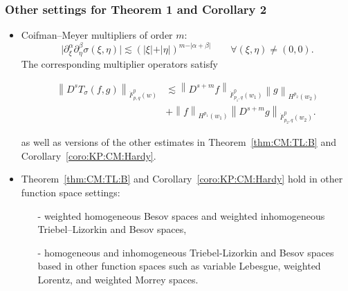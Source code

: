 \documentclass[xcolor=dvipsnames]{beamer}
\newcommand{\abs}[1]{\vert #1 \vert}
\newcommand{\norm}[2]{{\left\| #1 \right\|}_{#2}}
\newcommand{\tlw}[4]{\dot F_{#1,#3}^{#2}(#4)} %
\begin{document}
\begin{frame}\frametitle{Other settings for Theorem 1 and Corollary 2}

\begin{itemize}
\item Coifman--Meyer multipliers of order $m:$
\begin{equation*}
\abs{\partial_\xi^\alpha\partial_\eta^\beta\sigma(\xi,\eta)}\lesssim (\abs{\xi}+\abs{\eta})^{m-\abs{\alpha+\beta}} \quad \quad \forall (\xi,\eta)\neq(0,0).
\end{equation*}
The corresponding multiplier operators satisfy

\begin{align*}
\norm{D^s T_\sigma(f,g)}{\tlw{p}{0}{q}{w}} &\lesssim \norm{D^{s+m}f}{\tlw{p_1}{0}{q}{w_1} } \norm{g}{H^{p_2}(w_2)} \\
& +  \norm{f}{H^{p_1}(w_1)} \norm{D^{s+m}g}{\tlw{p_2}{0}{q}{w_2} }.
\end{align*}

as well as versions of the other estimates in Theorem~\ref{thm:CM:TL:B} and Corollary~\ref{coro:KP:CM:Hardy}.

\bigskip


\item Theorem~\ref{thm:CM:TL:B} and Corollary~\ref{coro:KP:CM:Hardy} hold in other function space settings: 

\begin{enumerate}[-]
\item[-] weighted homogeneous Besov spaces and weighted inhomogeneous Triebel--Lizorkin and Besov spaces,

\item[-] homogeneous and inhomogeneous Triebel-Lizorkin and Besov spaces based in other function spaces such as variable Lebesgue, weighted Lorentz, and weighted Morrey spaces. 
\end{enumerate}
\end{itemize}
\end{frame}
\end{document}
